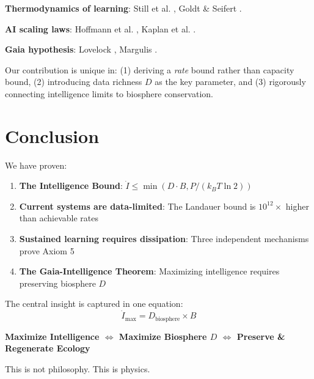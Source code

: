\documentclass{article}
\begin{document}
\textbf{Thermodynamics of learning}: Still et al. \cite{still2012}, Goldt \& Seifert \cite{goldt2017}.

\textbf{AI scaling laws}: Hoffmann et al. \cite{hoffmann2022}, Kaplan et al. \cite{kaplan2020}.

\textbf{Gaia hypothesis}: Lovelock \cite{lovelock1979}, Margulis \cite{margulis1998}.

Our contribution is unique in: (1) deriving a \textit{rate} bound rather than capacity bound, (2) introducing data richness $D$ as the key parameter, and (3) rigorously connecting intelligence limits to biosphere conservation.

\section{Conclusion}

We have proven:

\begin{enumerate}
    \item \textbf{The Intelligence Bound}: $\dot{I} \leq \min(D \cdot B, P/(k_B T \ln 2))$
    \item \textbf{Current systems are data-limited}: The Landauer bound is $10^{12}\times$ higher than achievable rates
    \item \textbf{Sustained learning requires dissipation}: Three independent mechanisms prove Axiom 5
    \item \textbf{The Gaia-Intelligence Theorem}: Maximizing intelligence requires preserving biosphere $D$
\end{enumerate}

The central insight is captured in one equation:
\begin{equation}
\boxed{\dot{I}_{\max} = D_{\text{biosphere}} \times B}
\end{equation}

\textbf{Maximize Intelligence $\Leftrightarrow$ Maximize Biosphere $D$ $\Leftrightarrow$ Preserve \& Regenerate Ecology}

This is not philosophy. This is physics.



\end{document}
